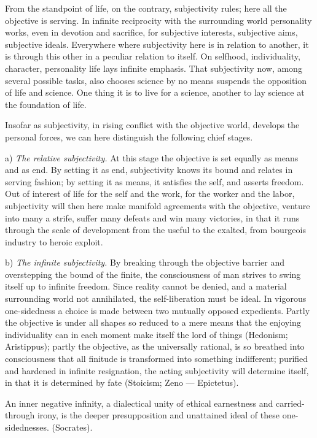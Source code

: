 \documentclass[12pt]{book}
\begin{document}
From the standpoint of life, on the contrary, subjectivity rules; here all the objective
is serving. In infinite reciprocity with the surrounding world personality works, even in
devotion and sacrifice, for subjective interests, subjective aims, subjective ideals.
Everywhere where subjectivity here is in relation to another, it is through this other in
a peculiar relation to itself. On selfhood, individuality, character, personality life
lays infinite emphasis. That subjectivity now, among several possible tasks, also chooses
science by no means suspends the opposition of life and science. One thing it is to live
for a science, another to lay science at the foundation of life.

Insofar as subjectivity, in rising conflict with the objective world, develops the
personal forces, we can here distinguish the following chief stages.

a) \emph{The relative subjectivity.} At this stage the objective is set equally as means
and as end. By setting it as end, subjectivity knows its bound and relates in serving
fashion; by setting it as means, it satisfies the self, and asserts freedom. Out of
interest of life for the self and the work, for the worker and the labor, subjectivity
will then here make manifold agreements with the objective, venture into many a strife,
suffer many defeats and win many victories, in that it runs
through the scale of development from the useful to the exalted, from bourgeois industry
to heroic exploit.

b) \emph{The infinite subjectivity.} By breaking through the objective barrier and
overstepping the bound of the finite, the consciousness of man strives to swing itself up
to infinite freedom. Since reality cannot be denied, and a material surrounding world not
annihilated, the self-liberation must be ideal. In vigorous one-sidedness a choice is
made between two mutually opposed expedients. Partly the objective is under all shapes so
reduced to a mere means that the enjoying individuality can in each moment make itself the
lord of things (Hedonism; Aristippus); partly the objective, as the universally rational,
is so breathed into consciousness that all finitude is transformed into something
indifferent; purified and hardened in infinite resignation, the acting subjectivity will
determine itself, in that it is determined by fate (Stoicism; Zeno — Epictetus).

An inner negative infinity, a dialectical unity of ethical earnestness and carried-through
irony, is the deeper presupposition and unattained ideal of these one-sidednesses.
(Socrates).
\end{document}
